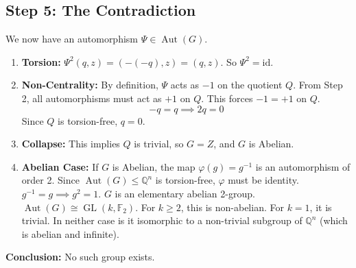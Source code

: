 \documentclass{book}
\let\temp\phi
\let\phi\varphi
\let\varphi\temp
\begin{document}
\subsection*{Step 5: The Contradiction}
We now have an automorphism $\Psi \in \operatorname{Aut}(G)$.
\begin{enumerate}
    \item \textbf{Torsion:} $\Psi^2(q, z) = (-(-q), z) = (q, z)$. So $\Psi^2 = \text{id}$.
    \item \textbf{Non-Centrality:} By definition, $\Psi$ acts as $-1$ on the quotient $Q$.
    From Step 2, all automorphisms must act as $+1$ on $Q$.
    This forces $-1 = +1$ on $Q$.
    \[ -q = q \implies 2q = 0 \]
    Since $Q$ is torsion-free, $q=0$.
    \item \textbf{Collapse:} This implies $Q$ is trivial, so $G = Z$, and $G$ is Abelian.
    \item \textbf{Abelian Case:} If $G$ is Abelian, the map $\phi(g) = g^{-1}$ is an automorphism of order 2.
    Since $\operatorname{Aut}(G) \le \mathbb{Q}^n$ is torsion-free, $\phi$ must be identity.
    $g^{-1} = g \implies g^2 = 1$.
    $G$ is an elementary abelian 2-group.
    $\operatorname{Aut}(G) \cong \operatorname{GL}(k, \mathbb{F}_2)$.
    For $k \ge 2$, this is non-abelian. For $k=1$, it is trivial.
    In neither case is it isomorphic to a non-trivial subgroup of $\mathbb{Q}^n$ (which is abelian and infinite).
\end{enumerate}
\textbf{Conclusion:} No such group exists.



\newpage
\printbibliography
\end{document}
